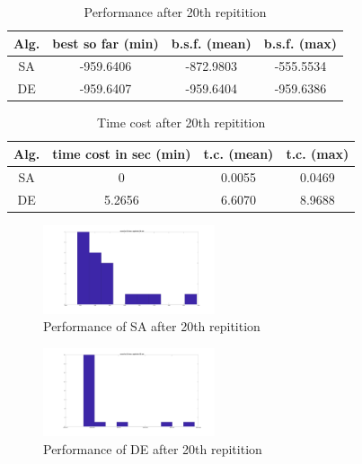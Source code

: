 \documentclass{IEEEtran}
\begin{document}
{{{            \begin{table}[!hbp]
                \centering
                \begin{tabular}{|c|c|c|c|}
                    \hline
                    Alg. & best so far (min) & b.s.f. (mean) & b.s.f. (max) \\
                    \hline
                    SA &  -959.6406 &  -872.9803 &  -555.5534 \\
                    \hline
                    DE &  -959.6407 &  -959.6404 &  -959.6386 \\
                    \hline
                \end{tabular}
                \caption{Performance after 20th repitition}
                \label{tab:performance_Q1}
            \end{table}

            \begin{table}[!hbp]
                \centering
                \begin{tabular}{|c|c|c|c|}
                    \hline
                    Alg. & time cost in sec (min) & t.c. (mean) & t.c. (max) \\
                    \hline
                    SA &  0 &  0.0055 &  0.0469 \\
                    \hline
                    DE &  5.2656 &  6.6070 &  8.9688 \\
                    \hline
                \end{tabular}
                \caption{Time cost after 20th repitition}
                \label{tab:timecost_Q1}
            \end{table}

            \begin{figure}[!htbp]
                \centering
                \includegraphics[width=0.45\textwidth]{Q1/figures/eggholder_SA_test.png}
                \caption{Performance of SA after 20th repitition}
                \label{fig:eggholder_SA}
            \end{figure}

            \begin{figure}[!htbp]
                \centering
                \includegraphics[width=0.45\textwidth]{Q1/figures/eggholder_DE_test.png}
                \caption{Performance of DE after 20th repitition}
                \label{fig:eggholder_DE}
            \end{figure}

}}}
\end{document}
